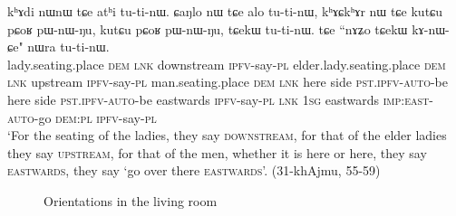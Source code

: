 \begin{exe}
\ex \label{ex:khAjmu.orientation}
\gll kʰɤdi nɯnɯ tɕe atʰi tu-ti-nɯ. ɕaŋlo nɯ tɕe alo tu-ti-nɯ,
kʰɤɕkʰɤr nɯ tɕe kutɕu pɕoʁ pɯ-nɯ-ŋu, kutɕu pɕoʁ pɯ-nɯ-ŋu, 
tɕekɯ tu-ti-nɯ. tɕe ``nɤʑo tɕekɯ kɤ-nɯ-ɕe" nɯra tu-ti-nɯ. \\
lady.seating.place \textsc{dem} \textsc{lnk} {downstream} \textsc{ipfv}-say-\textsc{pl} elder.lady.seating.place \textsc{dem} \textsc{lnk} upstream \textsc{ipfv}-say-\textsc{pl} man.seating.place \textsc{dem} \textsc{lnk} here side \textsc{pst}.\textsc{ipfv}-\textsc{auto}-be here side \textsc{pst}.\textsc{ipfv}-\textsc{auto}-be eastwards \textsc{ipfv}-say-\textsc{pl} \textsc{lnk} \textsc{1sg} eastwards \textsc{imp}:\textsc{east}-\textsc{auto}-go \textsc{dem}:\textsc{pl} \textsc{ipfv}-say-\textsc{pl} \\
\glt `For the seating of the ladies, they say \textsc{downstream}, for that of the elder ladies they say \textsc{upstream}, for that of the men, whether it is here or here, they say \textsc{eastwards}, they say `go over there \textsc{eastwards}'. (31-khAjmu, 55-59)
\end{exe}



\begin{figure} 
\caption{Orientations in the living room}
\label{fig:kitchen}
\end{figure}

